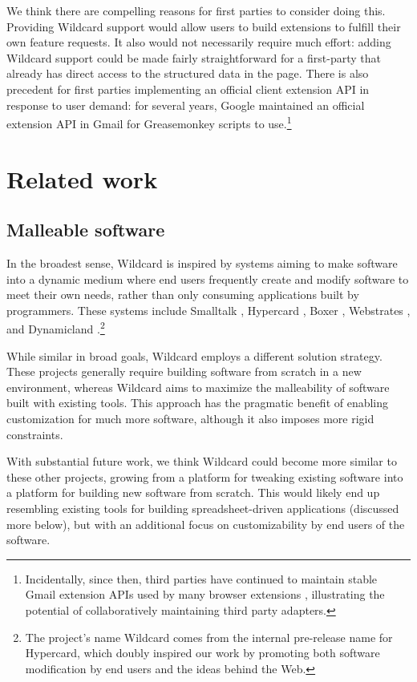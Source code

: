 \documentclass[english,submission]{programming}
\begin{document}
We think there are compelling reasons for first parties to consider
doing this. Providing Wildcard support would allow users to build
extensions to fulfill their own feature requests. It also would not
necessarily require much effort: adding Wildcard support could be made
fairly straightforward for a first-party that already has direct access
to the structured data in the page. There is also precedent for first
parties implementing an official client extension API in response to
user demand: for several years, Google maintained an official extension
API in Gmail for Greasemonkey scripts to use.\footnote{Incidentally,
  since then, third parties have continued to maintain stable Gmail
  extension APIs used by many browser extensions
  \autocite{streak,talwar2019}, illustrating the potential of
  collaboratively maintaining third party adapters.}

\hypertarget{sec:related-work}{%
\section{Related work}\label{sec:related-work}}

\hypertarget{malleable-software}{%
\subsection{Malleable software}\label{malleable-software}}

In the broadest sense, Wildcard is inspired by systems aiming to make
software into a dynamic medium where end users frequently create and
modify software to meet their own needs, rather than only consuming
applications built by programmers. These systems include Smalltalk
\autocite{kay1977}, Hypercard \autocite{hypercard2019} , Boxer
\autocite{disessa1986}, Webstrates \autocite{klokmose2015}, and
Dynamicland \autocite{victor}.\footnote{The project's name Wildcard
  comes from the internal pre-release name for Hypercard, which doubly
  inspired our work by promoting both software modification by end users
  and the ideas behind the Web.}

While similar in broad goals, Wildcard employs a different solution
strategy. These projects generally require building software from
scratch in a new environment, whereas Wildcard aims to maximize the
malleability of software built with existing tools. This approach has
the pragmatic benefit of enabling customization for much more software,
although it also imposes more rigid constraints.

With substantial future work, we think Wildcard could become more
similar to these other projects, growing from a platform for tweaking
existing software into a platform for building new software from
scratch. This would likely end up resembling existing tools for building
spreadsheet-driven applications (discussed more below), but with an
additional focus on customizability by end users of the software.
\end{document}
